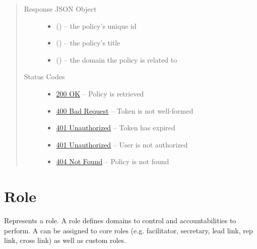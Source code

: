\documentclass[letterpaper,10pt,english]{sphinxmanual}
\begin{document}
\begin{fulllineitems}
\begin{quote}
\begin{description}
\begin{itemize}
\end{itemize}

\item[{Response JSON Object}] \leavevmode\begin{itemize}
\item {} 
 () -- the policy's unique id

\item {} 
 () -- the policy's title

\item {} 
 () -- the domain the policy is related to

\end{itemize}

\item[{Status Codes}] \leavevmode\begin{itemize}
\item {} 
\href{http://www.w3.org/Protocols/rfc2616/rfc2616-sec10.html\#sec10.2.1}{200 OK} -- Policy is retrieved

\item {} 
\href{http://www.w3.org/Protocols/rfc2616/rfc2616-sec10.html\#sec10.4.1}{400 Bad Request} -- Token is not well-formed

\item {} 
\href{http://www.w3.org/Protocols/rfc2616/rfc2616-sec10.html\#sec10.4.2}{401 Unauthorized} -- Token has expired

\item {} 
\href{http://www.w3.org/Protocols/rfc2616/rfc2616-sec10.html\#sec10.4.2}{401 Unauthorized} -- User is not authorized

\item {} 
\href{http://www.w3.org/Protocols/rfc2616/rfc2616-sec10.html\#sec10.4.5}{404 Not Found} -- Policy is not found

\end{itemize}

\end{description}\end{quote}

\end{fulllineitems}



\section{Role}
\label{\detokenize{resources/role:role}}\label{\detokenize{resources/role::doc}}\label{\detokenize{resources/role:id1}}
Represents a role. A role defines domains to control and accountabilities to perform. A {\hyperref[\detokenize{resources/partner:partner}]{}} can be assigned to core roles (e.g. facilitator, secretary, lead link, rep link, cross link) as well as custom roles.
\end{document}
